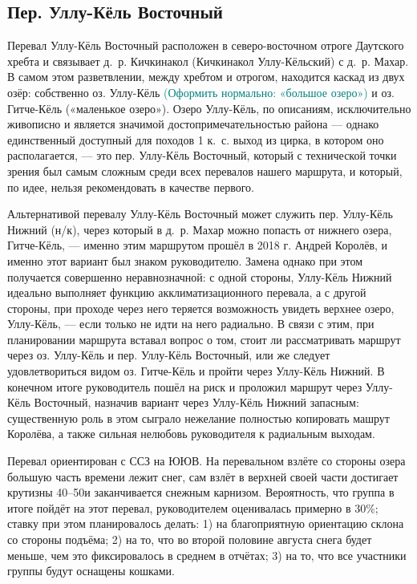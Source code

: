 \subsection{Пер. Уллу-Кёль Восточный} 
Перевал Уллу-Кёль Восточный расположен в северо-восточном отроге Даутского хребта и связывает д.~р. Кичкинакол (Кичкинакол Уллу-Кёльский) с д.~р. Махар. В самом этом разветвлении, между хребтом и отрогом, находится каскад из двух озёр: собственно оз. Уллу-Кёль \textcolor{teal}{(Оформить нормально: «большое озеро»)} и оз. Гитче-Кёль («маленькое озеро»). Озеро Уллу-Кёль, по описаниям, исключительно живописно и является значимой достопримечательностью района --- однако единственный доступный для походов 1 к.~с. выход из цирка, в котором оно располагается, --- это пер. Уллу-Кёль Восточный, который с технической точки зрения был самым сложным среди всех перевалов нашего маршрута, и который, по идее, нельзя рекомендовать в качестве первого. 

Альтернативой перевалу Уллу-Кёль Восточный может служить пер. Уллу-Кёль Нижний (н/к), через который в д.~р. Махар можно попасть от нижнего озера, Гитче-Кёль, --- именно этим маршрутом прошёл в 2018 г. Андрей Королёв, и именно этот вариант был знаком руководителю. Замена однако при этом получается совершенно неравнозначной: с одной стороны, Уллу-Кёль Нижний идеально выполняет функцию акклиматизационного перевала, а с другой стороны, при проходе через него теряется возможность увидеть верхнее озеро, Уллу-Кёль, --- если только не идти на него радиально. В связи с этим, при планировании маршрута вставал вопрос о том, стоит ли рассматривать маршрут через оз. Уллу-Кёль и пер. Уллу-Кёль Восточный, или же следует удовлетвориться видом оз. Гитче-Кёль и пройти через Уллу-Кёль Нижний. В конечном итоге руководитель пошёл на риск и проложил маршрут через Уллу-Кёль Восточный, назначив вариант через Уллу-Кёль Нижний запасным: существенную роль в этом сыграло нежелание полностью копировать машрут Королёва, а также сильная нелюбовь руководителя к радиальным выходам. 

Перевал ориентирован с ССЗ на ЮЮВ. На перевальном взлёте со стороны озера большую часть времени лежит снег, сам взлёт в верхней своей части достигает крутизны 40--50\degree и заканчивается снежным карнизом. Вероятность, что группа в итоге пойдёт на этот перевал, руководителем оценивалась примерно в 30\%; ставку при этом планировалось делать: 1) на благоприятную ориентацию склона со стороны подъёма; 2) на то, что во второй половине августа снега будет меньше, чем это фиксировалось в среднем в отчётах; 3) на то, что все участники группы будут оснащены кошками. 